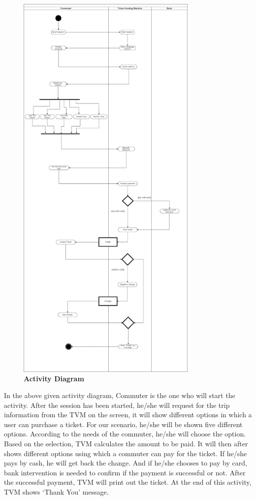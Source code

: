 \documentclass[15pt]{article}
\begin{document}
\begin{figure}[H]
\centering
\includegraphics[width=250pt,height=\textheight,keepaspectratio]{Activity_Diagram.png}
\caption{\Large\bfseries{Activity Diagram}}
\label{Activity Diagram:do}
\end{figure}

In the above given activity diagram, Commuter is the one who will start the activity. After the session has been started, he/she will request for the trip information from the TVM on the screen, it will show different options in which a user can purchase a ticket. For our scenario, he/she will be shown five different options. According to the needs of the commuter, he/she will choose the option. Based on the selection, TVM calculates the amount to be paid. It will then after shows different options using which a commuter can pay for the ticket. If he/she pays by cash, he will get back the change. And if he/she chooses to pay by card, bank intervention is needed to confirm if the payment is successful or not. After the successful payment, TVM will print out the ticket. At the end of this activity, TVM shows ‘Thank You’ message. 
\end{document}
